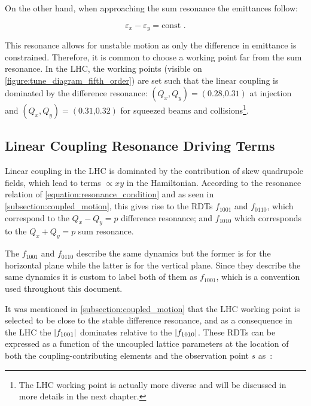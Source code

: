 On the other hand, when approaching the sum resonance the emittances follow:

\begin{equation}
    \varepsilon_x - \varepsilon_y = \mathrm{const} \text{ .}
    \label{equation:coupled_emittances_sum_resonance}
\end{equation}

This resonance allows for unstable motion as only the difference in emittance is constrained.
Therefore, it is common to choose a working point far from the sum resonance.
In the \gls{LHC}, the working points (visible on \cref{figure:tune_diagram_fifth_order}) are set such that the linear coupling is dominated by the difference resonance: \((Q_x, Q_y) = (0.28 \text{,} 0.31)\) at injection and \((Q_x, Q_y) = (0.31 \text{,} 0.32)\) for squeezed beams and collisions\footnote{The LHC working point is actually more diverse and will be discussed in more details in the next chapter.}.

\subsection{Linear Coupling Resonance Driving Terms}
\label{subsection:measurement_coupling_rdts}

Linear coupling in the \gls{LHC} is dominated by the contribution of \gls{skew} quadrupole fields, which lead to terms \(\propto xy\) in the Hamiltonian.
According to the resonance relation of \cref{equation:resonance_condition} and as seen in \cref{subsection:coupled_motion}, this gives rise to the \glspl{RDT} \(f_{1001}\) and \(f_{0110}\), which correspond to the \(Q_x - Q_y = p\) difference resonance; and \(f_{1010}\) which corresponds to the \(Q_x + Q_y = p\) sum resonance.

The \(f_{1001}\) and \(f_{0110}\) describe the same dynamics but the former is for the horizontal plane while the latter is for the vertical plane.
Since they describe the same dynamics it is custom to label both of them as \(f_{1001}\), which is a convention used throughout this document.

It was mentioned in \cref{subsection:coupled_motion} that the \gls{LHC} working point is selected to be close to the stable difference resonance, and as a consequence in the LHC the \(\left\lvert f_{1001} \right\rvert\) dominates relative to the \(\left\lvert f_{1010} \right\rvert\).
These \glspl{RDT} can be expressed as a function of the uncoupled lattice parameters at the location of both the coupling-contributing elements and the observation point \(s\) as~\cite{PHREV:Guignard:Betatron_Coupling_Radiation}:

